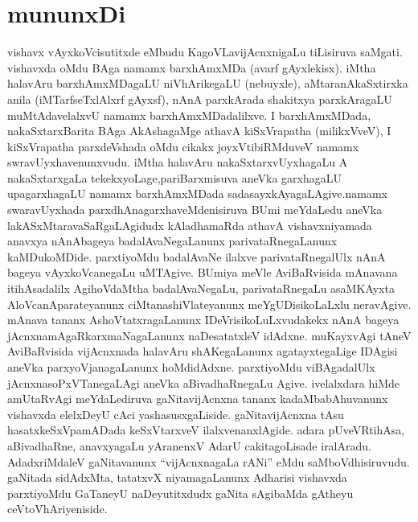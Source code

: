 \chapter*{mununxDi}

vishavx vAyxkoVcisutitxde eMbudu KagoVLavijAcnxnigaLu tiLisiruva saMgati. vishavxda oMdu BAga namamx barxhAmxMDa (avarf gAyxlekisx). iMtha halavAru barxhAmxMDagaLU niVhArike\-gaLU (nebuyxle), aMtaranAkaSxtirxka anila (iMTarfseTxlAlxrf gAyxsf), nAnA parxkArada shakitxya parxkAra\-gaLU muMtAdavelalxvU namamx barxhAmxMDadalilxve. I barxhAmxMDada, nakaSxtarxBarita BAga AkAsha\-gaMge athavA kiSxVrapatha (milikxVveV), I kiSxVrapatha parxdeVshada oMdu cikakx joyxVtibiRMduveV namamx swravUyxhavenunxvudu. iMtha halavAru nakaSxtarxvUyxhagaLu A nakaSxtarxgaLa tekekxyoLage,\break pariBarxmisuva aneVka garxhagaLU upagarxhagaLU namamx barxhAmxMDada sadasayxkAyagaLAgive.\break namamx swaravUyxhada parxdhAnagarxhaveMdenisiruva BUmi meYdaLedu aneVka lakASxMtaravaSaR\-gaLAgidudx kAladhamaRda athavA vishavxniyamada anavxya nAnAbageya badalAvaNegaLanunx parivataRnegaLanunx kaMDukoMDide. parxtiyoMdu badalAvaNe ilalxve parivataRnegalUlx nAnA bageya vAyxkoVcanegaLu uMTAgive. BUmiya meVle AviBaRvisida mAnavana itihAsadalilx AgihoVdaMtha badalAvaNegaLu, parivataRnegaLu asaMKAyxta AloVcanAparateyanunx ciMtanashiVlateyanunx meYgUDisikoLaLxlu neravAgive. mAnava tananx AshoVtatxragaLanunx IDeVrisikoLuLxvudakekx nAnA bageya jAcnxnamAgaRkarxmaNagaLanunx naDesatatxleV idAdxne. muKayxvAgi tAneV AviBaRvisida vijAcnxnada halavAru shAKegaLanunx agatayxtegaLige IDAgisi aneVka parxyoVjanagaLanunx hoMdidAdxne. parxtiyoMdu viBAgadalUlx jAcnxnasoPxVTanegaLAgi aneVka aBivadhaRnegaLu Agive. ivelalxdara hiMde amUtaRvAgi meYdaLediruva gaNitavijAcnxna tananx kadaMbabAhuvanunx vishavxda elelxDeyU cAci yashasusxgaLiside. gaNitavijAcnxna tAsu hasatxkeSxVpamADada keSxVtarxveV ilalxvenanxlAgide. adara pUveVRtihAsa, aBivadhaRne, anavxyagaLu yAranenxV AdarU cakitagoLisade iralAradu. AdadxriMdaleV gaNitavanunx ``vijAcnxnagaLa rANi'' eMdu saMboVdhisiruvudu. gaNitada sidAdxMta, tatatxvX niyamagaLanunx Adharisi vishavxda parxtiyoMdu GaTaneyU naDeyutitxdudx gaNita sAgibaMda gAtheyu ceVtoVhAriyeniside.

\bigskip


